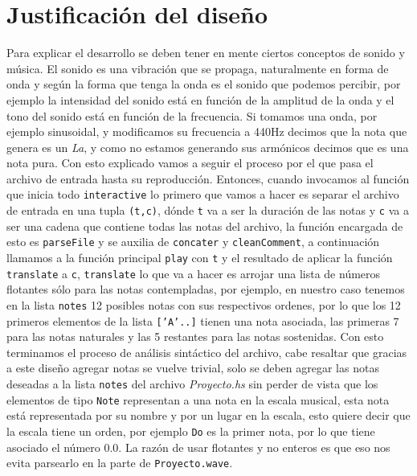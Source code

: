 \documentclass[10pt,a4paper]{article}
\begin{document}
\section{Justificación del diseño}
\noindent Para explicar el desarrollo se deben tener en mente ciertos conceptos
de sonido y música. El sonido es una vibración que se propaga, naturalmente en
forma de onda y según la forma que tenga la onda es el sonido que podemos
percibir, por ejemplo la intensidad del sonido está en función de la amplitud
de la onda y el tono del sonido está en función de la frecuencia. Si tomamos una
onda, por ejemplo sinusoidal, y modificamos su frecuencia a 440Hz decimos que la
nota que genera es un \textit{La}, y como no estamos generando sus armónicos
decimos que es una nota pura.
Con esto explicado vamos a seguir el proceso por el que pasa el archivo
de entrada hasta su reproducción. Entonces, cuando invocamos al función que inicia todo
\textcolor{gunaBlueLite}{\texttt{interactive}} lo primero que vamos a hacer es separar el archivo de
entrada en una tupla \texttt{(\textcolor{gunaOrange}{t},\textcolor{gunaOrange}{c})}, dónde \texttt{\textcolor{gunaOrange}{t}} va a ser la duración de las notas y
\texttt{\textcolor{gunaOrange}{c}} va a ser una cadena que contiene todas las notas del archivo, la
función encargada de esto es \textcolor{gunaBlueLite}{\texttt{parseFile}} y se auxilia de
\textcolor{gunaBlueLite}{\texttt{concater}} y \textcolor{gunaBlueLite}{\texttt{cleanComment}}, a continuación llamamos a la función
principal \textcolor{gunaBlueLite}{\texttt{play}} con \texttt{\textcolor{gunaOrange}{t}} y el resultado de aplicar la función
\textcolor{gunaBlueLite}{\texttt{translate}} a \textcolor{gunaOrange}{\texttt{c}}, \textcolor{gunaBlueLite}{\texttt{translate}} lo que va a hacer es arrojar
una lista de números flotantes sólo para las notas contempladas, por ejemplo, en
nuestro caso tenemos en la lista \textcolor{gunaOrage}{\texttt{notes}} 12 posibles notas con sus
respectivos ordenes, por lo que los 12 primeros elementos de la lista
\texttt{['A'..]} tienen una nota asociada, las primeras 7 para las notas
naturales y las 5 restantes para las notas sostenidas. Con esto terminamos el
proceso de análisis sintáctico del archivo, cabe resaltar que gracias a este diseño agregar notas se vuelve trivial, solo se deben agregar las notas deseadas a la lista \textcolor{gunaOrange}{\texttt{notes}} del archivo \textit{Proyecto.hs} sin perder de vista que los elementos de tipo \texttt{Note} representan a una nota en la escala musical, esta nota está representada por su nombre y por un lugar en la escala, esto quiere decir que la escala tiene un orden, por ejemplo \texttt{Do} es la primer nota, por lo que tiene asociado el número 0.0. La razón de usar flotantes y no enteros es que eso nos evita parsearlo en la parte de \textcolor{gunaBlueLite}{\texttt{Proyecto.wave}}.\\
\end{document}

